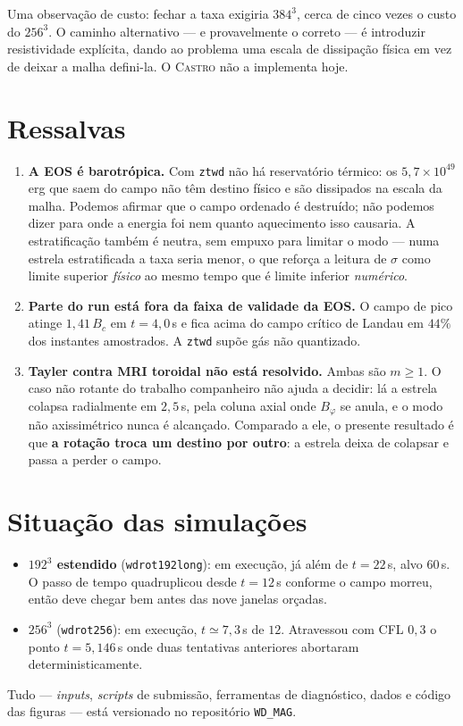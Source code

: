 \documentclass[11pt,a4paper]{article}
\newcommand{\Btor}{B_\varphi}
\begin{document}
Uma observação de custo: fechar a taxa exigiria $384^3$, cerca de cinco vezes o
custo do $256^3$. O caminho alternativo --- e provavelmente o correto --- é
introduzir resistividade explícita, dando ao problema uma escala de dissipação
física em vez de deixar a malha defini-la. O \textsc{Castro} não a implementa
hoje.

\section{Ressalvas}
\label{sec:ressalvas}

\begin{enumerate}\itemsep3pt
\item \textbf{A EOS é barotrópica.} Com \texttt{ztwd} não há reservatório
      térmico: os $5{,}7\times10^{49}$\,erg que saem do campo não têm destino
      físico e são dissipados na escala da malha. Podemos afirmar que o campo
      ordenado é destruído; não podemos dizer para onde a energia foi nem quanto
      aquecimento isso causaria. A estratificação também é neutra, sem empuxo
      para limitar o modo --- numa estrela estratificada a taxa seria menor, o
      que reforça a leitura de $\sigma$ como limite superior \emph{físico} ao
      mesmo tempo que é limite inferior \emph{numérico}.
\item \textbf{Parte do run está fora da faixa de validade da EOS.} O campo de
      pico atinge $1{,}41\,B_c$ em $t = 4{,}0$\,s e fica acima do campo crítico
      de Landau em $44\%$ dos instantes amostrados. A \texttt{ztwd} supõe gás não
      quantizado.
\item \textbf{Tayler contra MRI toroidal não está resolvido.} Ambas são $m\ge1$.
      O caso não rotante do trabalho companheiro não ajuda a decidir: lá a
      estrela colapsa radialmente em $2{,}5$\,s, pela coluna axial onde
      $\Btor$ se anula, e o modo não axissimétrico nunca é alcançado. Comparado
      a ele, o presente resultado é que \textbf{a rotação troca um destino por
      outro}: a estrela deixa de colapsar e passa a perder o campo.
\end{enumerate}

\section{Situação das simulações}

\begin{itemize}\itemsep2pt
\item \textbf{$192^3$ estendido} (\texttt{wdrot192long}): em execução, já além de
      $t = 22$\,s, alvo $60$\,s. O passo de tempo quadruplicou desde $t=12$\,s
      conforme o campo morreu, então deve chegar bem antes das nove janelas
      orçadas.
\item \textbf{$256^3$} (\texttt{wdrot256}): em execução, $t \simeq 7{,}3$\,s de
      $12$. Atravessou com CFL $0{,}3$ o ponto $t = 5{,}146$\,s onde duas
      tentativas anteriores abortaram deterministicamente.
\end{itemize}

Tudo --- \emph{inputs}, \emph{scripts} de submissão, ferramentas de diagnóstico,
dados e código das figuras --- está versionado no repositório \texttt{WD\_MAG}.
\end{document}
